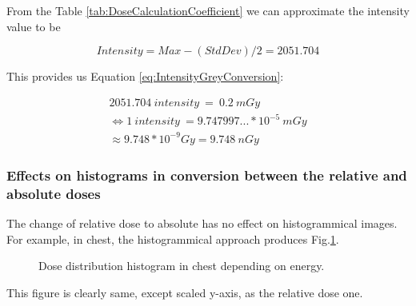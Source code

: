 \documentclass[fleqn,10pt]{SelfArx} %
\begin{document}
From the Table \ref{tab:DoseCalculationCoefficient} we can approximate the intensity value to be

\begin{equation}
Intensity= Max - (StdDev)/2 = 2051.704
\end{equation}

This provides us Equation \ref{eq:IntensityGreyConversion}:


\begin{equation}
\begin{split}
2051.704\ intensity\ =\ 0.2\ mGy\\
\Leftrightarrow 1\ intensity\ = 9.747997... * 10^{-5}\ mGy\\
\approx 9.748 * 10^{-9} Gy = 9.748\ nGy
\end{split}
\label{eq:IntensityGreyConversion}
\end{equation}

\subsubsection{Effects on histograms in conversion between the relative and absolute doses}

The change of relative dose to absolute has no effect on histogrammical images. For example, in chest, the histogrammical approach produces Fig.\ref{fig:ChestEnergyDose}.


\begin{figure}[ht]\centering
\caption{Dose distribution histogram in chest depending on energy. }
\label{fig:ChestEnergyDose}
\end{figure}
This figure is clearly same, except scaled y-axis, as the relative dose one.





\end{document}
